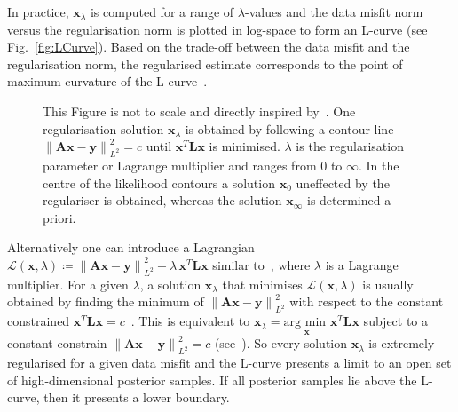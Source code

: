 In practice, $\bm{x}_{\lambda}$ is computed for a range of $\lambda$-values and the data misfit norm versus the regularisation norm is plotted in log-space to form an L-curve (see Fig.~\ref{fig:LCurve}).
Based on the trade-off between the data misfit and the regularisation norm, the regularised estimate corresponds to the point of maximum curvature of the L-curve~\cite{hansen1993use}.

\begin{figure}[ht!]
	\centering
	
	\caption[]{This Figure is not to scale and directly inspired by~\cite{ColinPhD}. One regularisation solution $\bm{x}_{\lambda}$ is obtained by following a contour line $\left\lVert \bm{A} \bm{x} -\bm{y} \right\rVert^2_{L^2}= c$ until $\bm{x}^T \bm{L} \bm{x}$ is minimised. $\lambda$ is the regularisation parameter or Lagrange multiplier and ranges from $0$ to $\infty$. In the centre of the likelihood contours a solution $\bm{x}_{0}$ uneffected by the regulariser is obtained, whereas the solution $\bm{x}_{\infty}$ is determined a-priori.}
	\label{fig:Langrangian}
\end{figure}
Alternatively one can introduce a Lagrangian $\mathcal{L}(\bm{x},\lambda)\coloneqq \left\lVert \bm{A} \bm{x} -\bm{y} \right\rVert^2_{L^2} + \lambda \, \bm{x}^T\bm{L} \bm{x}$ similar to~\cite{LiLagrange}, where $\lambda$ is a Lagrange multiplier.
For a given $\lambda$, a solution $\bm{x}_{\lambda} $ that minimises $\mathcal{L}(\bm{x},\lambda)$ is usually obtained by finding the minimum of $\left\lVert \bm{A} \bm{x} - \bm{y} \right\rVert^2_{L^2}$ with respect to the constant constrained $\bm{x}^T \bm{L} \bm{x} = c$~\cite[Fig.~2.13]{SANTOSH202265}.
This is equivalent to $\bm{x}_{\lambda}  = \underset{\bm{x}}{\text{arg min }}\bm{x}^T \bm{L} \bm{x}$ subject to a constant constrain $\left\lVert  \bm{A} \bm{x} -\bm{y} \right\rVert^2_{L^2}= c$ (see~\cite[fn.~6]{fox2016fast}). 
So every solution $\bm{x}_{\lambda}$ is extremely regularised for a given data misfit and the L-curve presents a limit to an open set of high-dimensional posterior samples.
If all posterior samples lie above the L-curve, then it presents a lower boundary.

